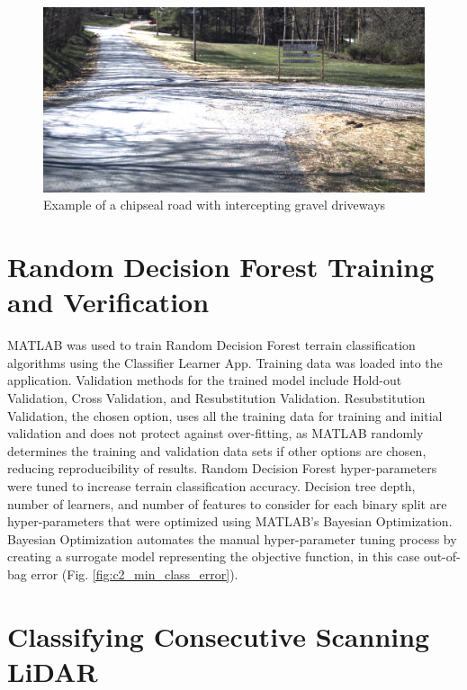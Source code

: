 \documentclass[numbered,pdftex]{ohio-etd}
\begin{document}
{{{		\begin{figure}[H]
			\centering
			\includegraphics[width=0.7\linewidth]{Defense_Images/blackburn_road}
			\caption[Example of Chipseal Road]{Example of a chipseal road with intercepting gravel driveways}
			\label{fig:chipseal_road_example}
		\end{figure}
	
	}
		
	
	\section{Random Decision Forest Training and Verification}
	
		{MATLAB was used to train Random Decision Forest terrain classification algorithms using the Classifier Learner App. Training data was loaded into the application. Validation methods for the trained model include Hold-out Validation, Cross Validation, and Resubstitution Validation. Resubstitution Validation, the chosen option, uses all the training data for training and initial validation and does not protect against over-fitting, as MATLAB randomly determines the training and validation data sets if other options are chosen, reducing reproducibility of results. Random Decision Forest hyper-parameters were tuned to increase terrain classification accuracy. Decision tree depth, number of learners, and number of features to consider for each binary split are hyper-parameters that were optimized using MATLAB's Bayesian Optimization. Bayesian Optimization automates the manual hyper-parameter tuning process by creating a surrogate model representing the objective function, in this case out-of-bag error (Fig. \ref{fig:c2_min_class_error}).}
		
		
	
	
		
	\section{Classifying Consecutive Scanning LiDAR}
	
}}
\end{document}
